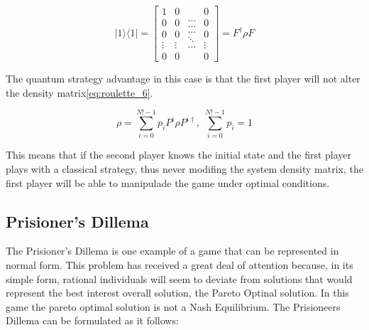 \begin{equation}
\label{eq:roulette_5}
\vert1\rangle\langle1\vert=\left[\begin{array}{c}
1\\
0\\
0\\
\vdots\\
0
\end{array}\begin{array}{c}
0\\
0\\
0\\
\vdots\\
0
\end{array}\begin{array}{c}
\ldots\\
\ldots\\
\ldots\\
\ddots\\
\ldots
\end{array}\begin{array}{c}
0\\
0\\
0\\
\vdots\\
0
\end{array}\right]=F^{\dagger}\rho F
\end{equation}


The quantum strategy advantage in this case is that the first player
will not alter the density matrix\ref{eq:roulette_6}.

\begin{equation}
\label{eq:roulette_6}
\rho=\sum_{i=0}^{N!-1}p_{i}P^{i}\rho P^{i\dagger},\;\sum_{i=0}^{N!-1}p_{i}=1
\end{equation}

This means that if the second player knows the initial state and the first player plays with a classical strategy, thus never modifing the system density matrix, the first player will be able to manipulade the game under optimal conditions.


\subsection{Prisioner's Dillema}
\label{sebsec:related_work_prisioners_dillama}

The Prisioner's Dillema is one example of a game that can be represented
in normal form. This problem has received a great deal of attention
because, in its simple form, rational individuals will seem to deviate
from solutions that would represent the best interest overall solution,
the Pareto Optinal solution. In this game the pareto optimal solution
is not a Nash Equilibrium. The Prisioneers Dillema can be formulated
as it follows:

